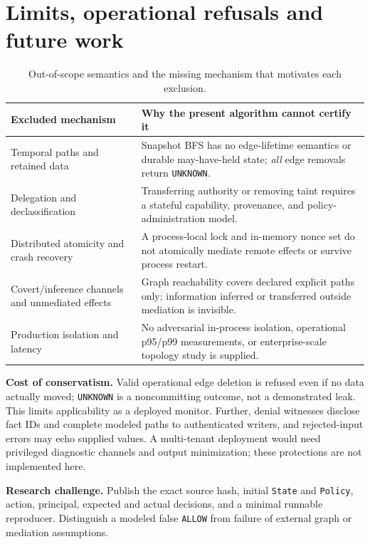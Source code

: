 \documentclass[11pt,letterpaper]{article}
\begin{document}
\section{Limits, operational refusals and future work}
\begin{table}[H]
\centering\footnotesize
\begin{tabularx}{\linewidth}{@{}p{.24\linewidth}X@{}}\toprule
Excluded mechanism & Why the present algorithm cannot certify it\\\midrule
Temporal paths and retained data & Snapshot BFS has no edge-lifetime semantics or durable may-have-held state; \emph{all} edge removals return \texttt{UNKNOWN}.\\
Delegation and declassification & Transferring authority or removing taint requires a stateful capability, provenance, and policy-administration model.\\
Distributed atomicity and crash recovery & A process-local lock and in-memory nonce set do not atomically mediate remote effects or survive process restart.\\
Covert/inference channels and unmediated effects & Graph reachability covers declared explicit paths only; information inferred or transferred outside mediation is invisible.\\
Production isolation and latency & No adversarial in-process isolation, operational p95/p99 measurements, or enterprise-scale topology study is supplied.\\\bottomrule
\end{tabularx}
\caption{Out-of-scope semantics and the missing mechanism that motivates each exclusion.}
\end{table}
\noindent\textbf{Cost of conservatism.} Valid operational edge deletion is refused even if no data actually moved; \texttt{UNKNOWN} is a noncommitting outcome, not a demonstrated leak. This limits applicability as a deployed monitor. Further, denial witnesses disclose fact IDs and complete modeled paths to authenticated writers, and rejected-input errors may echo supplied values. A multi-tenant deployment would need privileged diagnostic channels and output minimization; these protections are not implemented here.

\noindent\textbf{Research challenge.} Publish the exact source hash, initial \texttt{State} and \texttt{Policy}, action, principal, expected and actual decisions, and a minimal runnable reproducer. Distinguish a modeled false \texttt{ALLOW} from failure of external graph or mediation assumptions.
\end{document}
